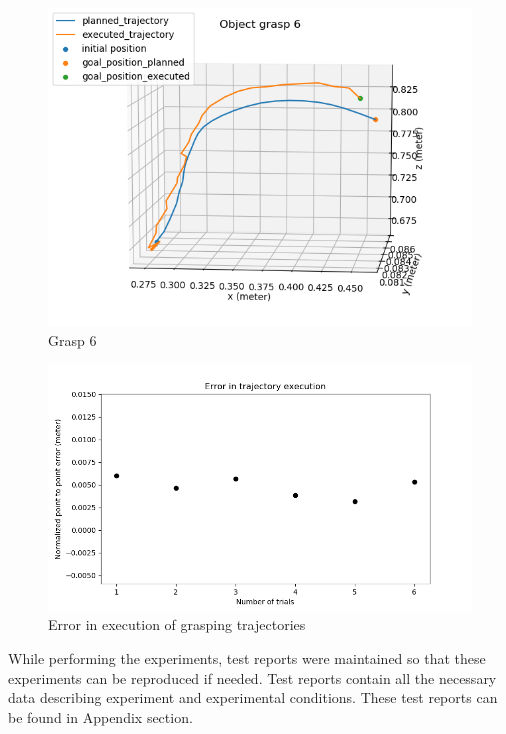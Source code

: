 \begin{figure}[H]
	\centering
	\includegraphics[scale=0.7]{images/HSR_4/6.png}
	\caption{Grasp 6}
	\label{fig:grasp_6}
\end{figure}


\begin{figure}[H]
	\centering
	\includegraphics[scale=0.7]{images/HSR_4/e.png}
	\caption{Error in execution of grasping trajectories}
	\label{fig:grasp_e}
\end{figure}

While performing the experiments, test reports were maintained so that these experiments can be reproduced if needed. Test reports contain all the necessary data describing experiment and experimental conditions. These test reports can be found in Appendix section. 
